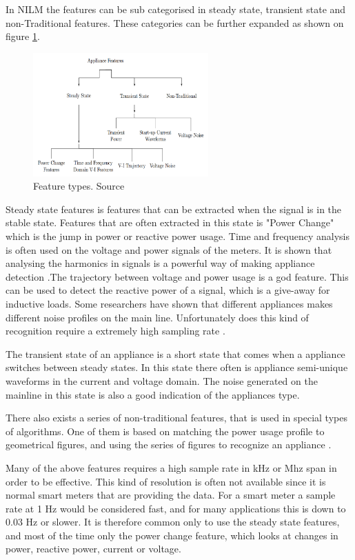 In NILM the features can be sub categorised in steady state, transient state and non-Traditional features.  These categories can be further expanded as shown on figure \ref{fig:FTR}. 

\begin{figure}[H]
\centering
\includegraphics[width=0.6\textwidth]{billeder/featureOverview.png}
\caption{Feature types. Source \citep{RefWorks:17}}
\label{fig:FTR}
\end{figure}

Steady state features is features that can be extracted when the signal is in the stable state. Features that are often extracted in this state is "Power Change" which is the jump in power or reactive power usage. Time and frequency analysis is often used on the voltage and power signals of the meters. It is shown that analysing the harmonics in signals is a powerful way of making appliance detection \citep{RefWorks:29}.The trajectory between voltage and power usage is a god feature. This can be used to detect the reactive power of a signal, which is a give-away for inductive loads. Some researchers have shown that different appliances makes different noise profiles on the main line. Unfortunately does this kind of recognition require a extremely high sampling rate \citep{RefWorks:30}. 

The transient state of an appliance is a short state that comes when a appliance switches between steady states. In this state there often is appliance semi-unique waveforms in the current and voltage domain. The noise generated on the mainline in this state is also a good indication of the appliances type. 

There also exists a series of non-traditional features, that is used in special types of algorithms. One of them is based on matching the power usage profile to geometrical figures, and using the series of figures to recognize an appliance \citep{RefWorks:17}.  

Many of the above features requires a high sample rate in kHz or Mhz span in order to be effective. This kind of resolution is often not available since it is normal smart meters that are providing the data. For a smart meter a sample rate at 1 Hz would be considered fast, and for many applications this is down to $0.03$ Hz or slower. It is therefore common only to use the steady state features, and most of the time only the power change feature, which looks at changes in power, reactive power, current or voltage. 

